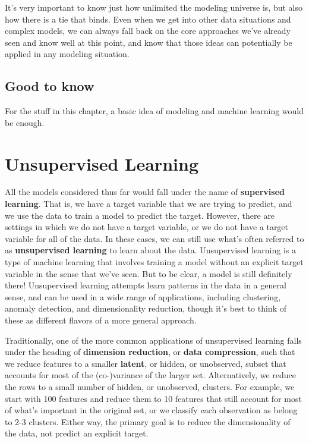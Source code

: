 \documentclass[
  letterpaper,
]{krantz}
\begin{document}
It's very important to know just how unlimited the modeling universe is,
but also how there is a tie that binds. Even when we get into other data
situations and complex models, we can always fall back on the core
approaches we've already seen and know well at this point, and know that
those ideas can potentially be applied in any modeling situation.

\subsection{Good to know}\label{good-to-know-2}

For the stuff in this chapter, a basic idea of modeling and machine
learning would be enough.

\section{Unsupervised Learning}\label{sec-ml-more-unsuper}

All the models considered thus far would fall under the name of
\textbf{supervised learning}. That is, we have a target variable that we
are trying to predict, and we use the data to train a model to predict
the target. However, there are settings in which we do not have a target
variable, or we do not have a target variable for all of the data. In
these cases, we can still use what's often referred to as
\textbf{unsupervised learning} to learn about the data. Unsupervised
learning is a type of machine learning that involves training a model
without an explicit target variable in the sense that we've seen. But to
be clear, a model is still definitely there! Unsupervised learning
attempts learn patterns in the data in a general sense, and can be used
in a wide range of applications, including clustering, anomaly
detection, and dimensionality reduction, though it's best to think of
these as different flavors of a more general approach.

Traditionally, one of the more common applications of unsupervised
learning falls under the heading of \textbf{dimension reduction}, or
\textbf{data compression}, such that we reduce features to a smaller
\textbf{latent}, or hidden, or unobserved, subset that accounts for most
of the (co-)variance of the larger set. Alternatively, we reduce the
rows to a small number of hidden, or unobserved, clusters. For example,
we start with 100 features and reduce them to 10 features that still
account for most of what's important in the original set, or we classify
each observation as belong to 2-3 clusters. Either way, the primary goal
is to reduce the dimensionality of the data, not predict an explicit
target.
\end{document}
